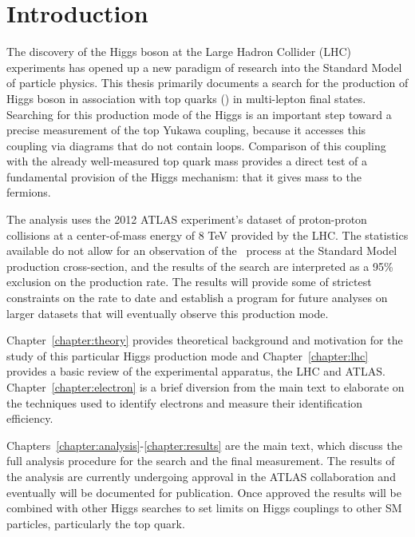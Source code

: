 \chapter[Introduction][Introduction]{Introduction}

The discovery of the Higgs boson at the Large Hadron Collider (LHC) experiments has opened up a new paradigm of research into the
Standard Model of particle physics.
This thesis primarily documents a search for the production of Higgs boson in association with top quarks (\tth) 
in multi-lepton final states.  Searching for this production mode of the Higgs is an important
step toward a precise measurement of the top Yukawa coupling, because it accesses this coupling via diagrams
that do not contain loops. Comparison of this coupling with the already well-measured top quark mass provides
a direct test of a fundamental provision of the Higgs mechanism: that it gives mass to the fermions. 

The analysis uses the 2012 ATLAS experiment's dataset of proton-proton collisions at 
a center-of-mass energy of 8 TeV provided by the LHC. The statistics available do not allow for an observation of the \tth\ process
at the Standard Model production cross-section, and the results of the search are interpreted as
a 95\% exclusion on the production rate. The results will provide some of strictest constraints on the rate to date and
establish a program for future analyses on larger datasets that will eventually observe this production mode. 

Chapter~\ref{chapter:theory} provides theoretical background and motivation for the study of this particular
Higgs production mode and Chapter~\ref{chapter:lhc} provides a basic review of the experimental apparatus,
the LHC and ATLAS. Chapter~\ref{chapter:electron} is a brief diversion
from the main text to elaborate on the techniques used to identify electrons and measure their identification
efficiency. 

Chapters~\ref{chapter:analysis}-\ref{chapter:results} are the main text, which discuss the full analysis
procedure for the search and the final measurement. The results of the analysis are currently undergoing approval
in the ATLAS collaboration and eventually will be documented for publication. Once approved the results
will be combined with other Higgs searches to set limits on Higgs couplings to other SM particles,
particularly the top quark. 
